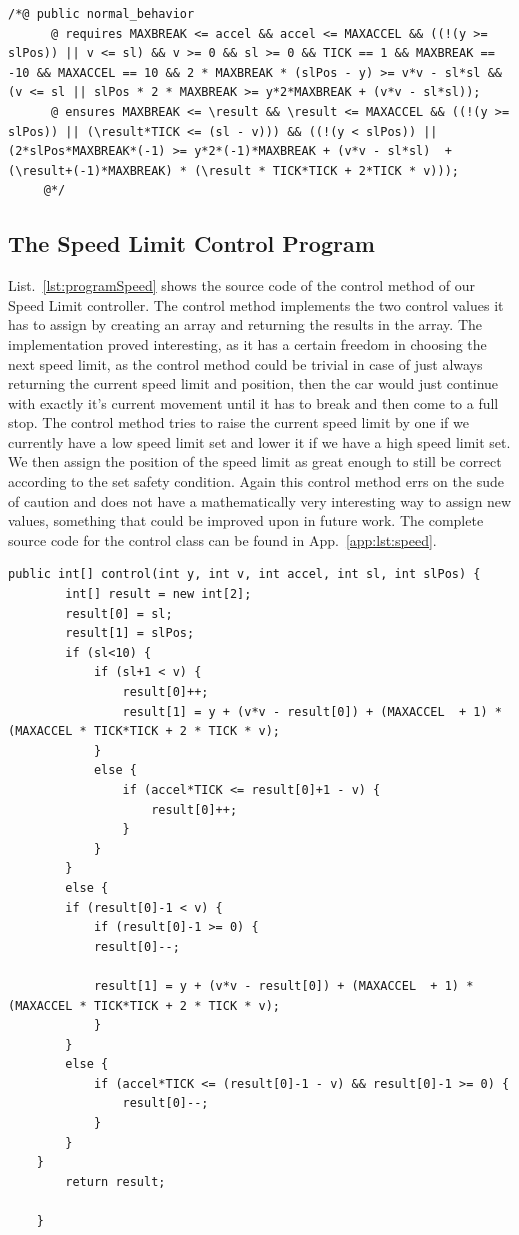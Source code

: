 \begin{lstlisting}[label=lst:CondCar]
/*@ public normal_behavior
	  @ requires MAXBREAK <= accel && accel <= MAXACCEL && ((!(y >= slPos)) || v <= sl) && v >= 0 && sl >= 0 && TICK == 1 && MAXBREAK == -10 && MAXACCEL == 10 && 2 * MAXBREAK * (slPos - y) >= v*v - sl*sl && (v <= sl || slPos * 2 * MAXBREAK >= y*2*MAXBREAK + (v*v - sl*sl));
	  @ ensures MAXBREAK <= \result && \result <= MAXACCEL && ((!(y >= slPos)) || (\result*TICK <= (sl - v))) && ((!(y < slPos)) || (2*slPos*MAXBREAK*(-1) >= y*2*(-1)*MAXBREAK + (v*v - sl*sl)  + (\result+(-1)*MAXBREAK) * (\result * TICK*TICK + 2*TICK * v)));
	 @*/
\end{lstlisting}

\subsection{The Speed Limit Control Program}
\label{subsec:traffic:speed}

List.~\ref{lst:programSpeed} shows the source code of the control method of our Speed Limit controller. The control method implements the two control values it has to assign by creating an array and returning the results in the array. The implementation proved interesting, as it has a certain freedom in choosing the next speed limit, as the control method could be trivial in case of just always returning the current speed limit and position, then the car would just continue with exactly it's current movement until it has to break and then come to a full stop. The control method tries to raise the current speed limit by one if we currently have a low speed limit set and lower it if we have a high speed limit set. We then assign the position of the speed limit as great enough to still be correct according to the set safety condition. Again this control method errs on the sude of caution and does not have a mathematically very interesting way to assign new values, something that could be improved upon in future work. The complete source code for the control class can be found in App.~\ref{app:lst:speed}.

\begin{lstlisting}[label=lst:programSpeed]
public int[] control(int y, int v, int accel, int sl, int slPos) {
		int[] result = new int[2];
		result[0] = sl;
		result[1] = slPos;
		if (sl<10) {
			if (sl+1 < v) {
				result[0]++;
				result[1] = y + (v*v - result[0]) + (MAXACCEL  + 1) * (MAXACCEL * TICK*TICK + 2 * TICK * v);
			}
			else {
				if (accel*TICK <= result[0]+1 - v) {
					result[0]++;
				}
			}
		}
		else {
		if (result[0]-1 < v) {
			if (result[0]-1 >= 0) {
			result[0]--;
			
			result[1] = y + (v*v - result[0]) + (MAXACCEL  + 1) * (MAXACCEL * TICK*TICK + 2 * TICK * v);
			}
		}
		else {
			if (accel*TICK <= (result[0]-1 - v) && result[0]-1 >= 0) {
				result[0]--;
			}
		}
	}
		return result;

	}
\end{lstlisting}


